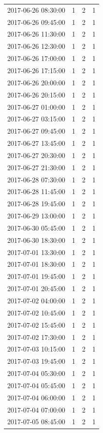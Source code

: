 \begin{tabular}{lrrr}
2017-06-26 08:30:00 & 1 & 2 & 1 \\
2017-06-26 09:45:00 & 1 & 2 & 1 \\
2017-06-26 11:30:00 & 1 & 2 & 1 \\
2017-06-26 12:30:00 & 1 & 2 & 1 \\
2017-06-26 17:00:00 & 1 & 2 & 1 \\
2017-06-26 17:15:00 & 1 & 2 & 1 \\
2017-06-26 20:00:00 & 1 & 2 & 1 \\
2017-06-26 20:15:00 & 1 & 2 & 1 \\
2017-06-27 01:00:00 & 1 & 2 & 1 \\
2017-06-27 03:15:00 & 1 & 2 & 1 \\
2017-06-27 09:45:00 & 1 & 2 & 1 \\
2017-06-27 13:45:00 & 1 & 2 & 1 \\
2017-06-27 20:30:00 & 1 & 2 & 1 \\
2017-06-27 21:30:00 & 1 & 2 & 1 \\
2017-06-28 07:30:00 & 1 & 2 & 1 \\
2017-06-28 11:45:00 & 1 & 2 & 1 \\
2017-06-28 19:45:00 & 1 & 2 & 1 \\
2017-06-29 13:00:00 & 1 & 2 & 1 \\
2017-06-30 05:45:00 & 1 & 2 & 1 \\
2017-06-30 18:30:00 & 1 & 2 & 1 \\
2017-07-01 13:30:00 & 1 & 2 & 1 \\
2017-07-01 18:30:00 & 1 & 2 & 1 \\
2017-07-01 19:45:00 & 1 & 2 & 1 \\
2017-07-01 20:45:00 & 1 & 2 & 1 \\
2017-07-02 04:00:00 & 1 & 2 & 1 \\
2017-07-02 10:45:00 & 1 & 2 & 1 \\
2017-07-02 15:45:00 & 1 & 2 & 1 \\
2017-07-02 17:30:00 & 1 & 2 & 1 \\
2017-07-03 10:15:00 & 1 & 2 & 1 \\
2017-07-03 19:45:00 & 1 & 2 & 1 \\
2017-07-04 05:30:00 & 1 & 2 & 1 \\
2017-07-04 05:45:00 & 1 & 2 & 1 \\
2017-07-04 06:00:00 & 1 & 2 & 1 \\
2017-07-04 07:00:00 & 1 & 2 & 1 \\
2017-07-05 08:45:00 & 1 & 2 & 1 \\

\end{tabular}
